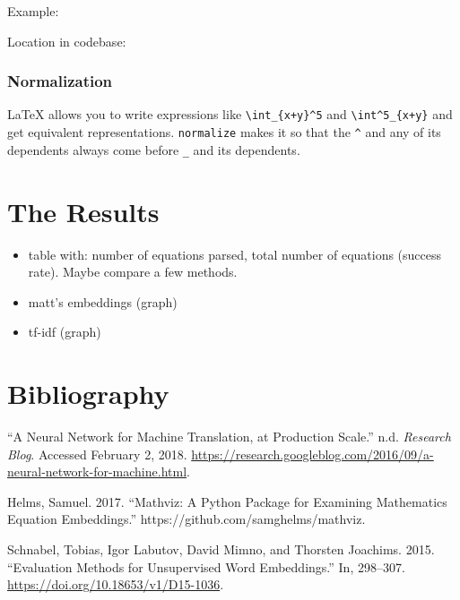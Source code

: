 \documentclass[]{article}
\begin{document}
Example:

Location in codebase:

\hypertarget{normalization}{%
\subsubsection{Normalization}\label{normalization}}

LaTeX allows you to write expressions like
\texttt{\textbackslash{}int\_\{x+y\}\^{}5} and
\texttt{\textbackslash{}int\^{}5\_\{x+y\}} and get equivalent
representations. \texttt{normalize} makes it so that the \texttt{\^{}}
and any of its dependents always come before \texttt{\_} and its
dependents.

\hypertarget{the-results}{%
\section{The Results}\label{the-results}}

\begin{itemize}
\item
  table with: number of equations parsed, total number of equations
  (success rate). Maybe compare a few methods.
\item
  matt's embeddings (graph)
\item
  tf-idf (graph)
\end{itemize}

\hypertarget{bibliography}{%
\section*{Bibliography}\label{bibliography}}

\hypertarget{refs}{}
\leavevmode\hypertarget{ref-noauthor_neural_nodate}{}%
``A Neural Network for Machine Translation, at Production Scale.'' n.d.
\emph{Research Blog}. Accessed February 2, 2018.
\url{https://research.googleblog.com/2016/09/a-neural-network-for-machine.html}.

\leavevmode\hypertarget{ref-samghelms_mathviz:_2017}{}%
Helms, Samuel. 2017. ``Mathviz: A Python Package for Examining
Mathematics Equation Embeddings.'' https://github.com/samghelms/mathviz.

\leavevmode\hypertarget{ref-schnabel_evaluation_2015}{}%
Schnabel, Tobias, Igor Labutov, David Mimno, and Thorsten Joachims.
2015. ``Evaluation Methods for Unsupervised Word Embeddings.'' In,
298--307. \url{https://doi.org/10.18653/v1/D15-1036}.
\end{document}
